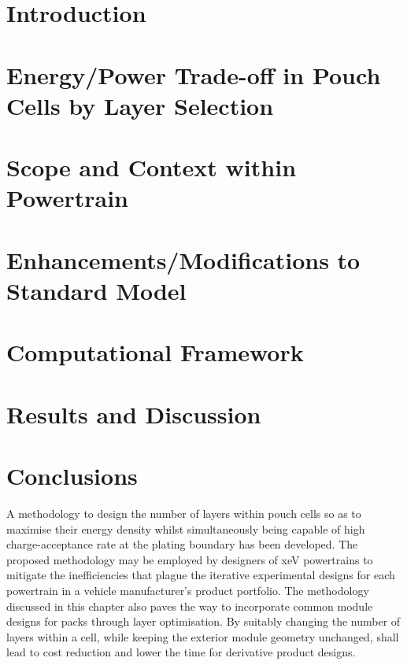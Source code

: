 

\section[Introduction]{Introduction}\label{sec:layeroptintro}


\section{Energy/Power Trade-off in Pouch Cells by Layer Selection}\label{sec:energypowertradeoff}


\section{Scope and Context within  Powertrain}


\section{Enhancements/Modifications to Standard  Model}\label{sec:numericalenhancements}


\section{Computational Framework}\label{sec:layeroptframework}


\section{Results and Discussion}\label{sec:resultslayeropt}


\section{Conclusions}

A methodology to design the number of layers within pouch cells so as to
maximise their energy density whilst simultaneously being capable of high
charge-acceptance rate at the plating boundary has been developed. The proposed
methodology may be employed by designers of \gls{xeV} powertrains to mitigate
the inefficiencies that plague the iterative experimental designs for each
powertrain in a vehicle manufacturer's product portfolio.  The methodology
discussed in this chapter also paves the way to incorporate common module
designs for packs through layer optimisation. By suitably changing the number of
layers within a cell, while keeping the exterior module geometry unchanged,
shall lead to cost reduction and lower the time for derivative product designs.

